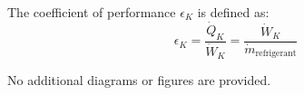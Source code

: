 The coefficient of performance \( \epsilon_K \) is defined as:  
\[
\epsilon_K = \frac{\dot{Q}_K}{\dot{W}_K} = \frac{\dot{W}_K}{\dot{m}_{\text{refrigerant}}}
\]  

No additional diagrams or figures are provided.